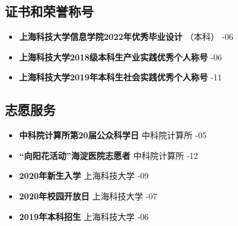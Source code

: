 \documentclass[a4paper,10pt]{ctexart} %
\begin{document}

\begin{keepsection}

\section{证书和荣誉称号}
\begin{itemize}
    \item \textbf{上海科技大学信息学院2022年优秀毕业设计} {\small （本科）} \hfill {}-06
    \item \textbf{上海科技大学2018级本科生产业实践优秀个人称号} \hfill {}-06
    \item \textbf{上海科技大学2019年本科生社会实践优秀个人称号} \hfill {}-11
\end{itemize}

\end{keepsection}



\begin{keepsection}

\section{志愿服务}
\begin{itemize}
    \item \textbf{中科院计算所第20届公众科学日}  \hfill 中科院计算所 -05
    \item \textbf{“向阳花活动”海淀医院志愿者}  \hfill 中科院计算所 -12
    \item \textbf{2020年新生入学}  \hfill 上海科技大学 -09
    \item \textbf{2020年校园开放日}  \hfill 上海科技大学 -07
    \item \textbf{2019年本科招生}  \hfill 上海科技大学 -06
\end{itemize}

\end{keepsection}
\end{document}
